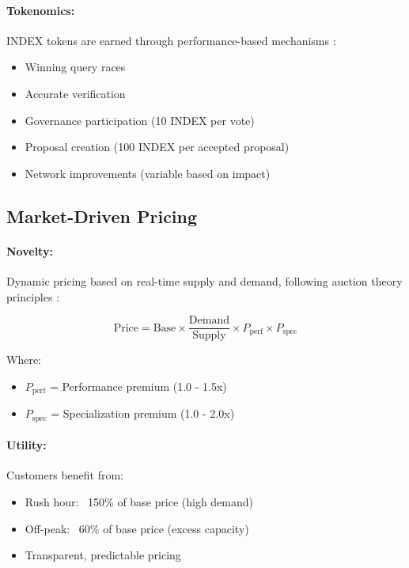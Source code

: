 \documentclass[12pt,a4paper]{article}
\begin{document}
\paragraph{Tokenomics:} INDEX tokens are earned through performance-based mechanisms \cite{tokeneconomics2018, mechanism2007}:
\begin{itemize}
    \item Winning query races
    \item Accurate verification
    \item Governance participation (10 INDEX per vote)
    \item Proposal creation (100 INDEX per accepted proposal)
    \item Network improvements (variable based on impact)
\end{itemize}

\subsection{Market-Driven Pricing}

\paragraph{Novelty:} Dynamic pricing based on real-time supply and demand, following auction theory principles \cite{auction2004}:

\begin{equation}
\text{Price} = \text{Base} \times \frac{\text{Demand}}{\text{Supply}} \times P_{\text{perf}} \times P_{\text{spec}}
\end{equation}

Where:
\begin{itemize}
    \item $P_{\text{perf}}$ = Performance premium (1.0 - 1.5x)
    \item $P_{\text{spec}}$ = Specialization premium (1.0 - 2.0x)
\end{itemize}

\paragraph{Utility:} Customers benefit from:
\begin{itemize}
    \item Rush hour: ~150\% of base price (high demand)
    \item Off-peak: ~60\% of base price (excess capacity)
    \item Transparent, predictable pricing
\end{itemize}
\end{document}
